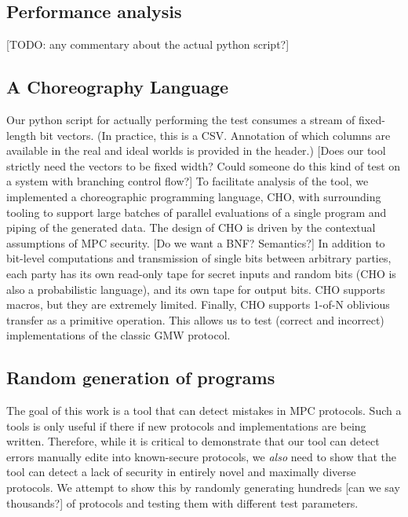 \documentclass[conference]{IEEEtran}
\begin{document}
\subsection{Performance analysis}

[TODO: any commentary about the actual python script?]

\subsection{A Choreography Language}

Our python script for actually performing the test consumes a stream of fixed-length bit vectors.
(In practice, this is a CSV. Annotation of which columns are available in the real and ideal worlds is provided in the header.)
[Does our tool strictly need the vectors to be fixed width? Could someone do this kind of test on a system with branching control flow?]
To facilitate analysis of the tool, we implemented a choreographic programming language, CHO,
with surrounding tooling to support large batches of parallel evaluations of a single program and piping of the generated data.
The design of CHO is driven by the contextual assumptions of MPC security.
[Do we want a BNF? Semantics?]
In addition to bit-level computations and transmission of single bits between arbitrary parties,
each party has its own read-only tape for secret inputs and random bits
(CHO is also a probabilistic language),
and its own tape for output bits.
CHO supports macros, but they are extremely limited.
Finally, CHO supports 1-of-N oblivious transfer as a primitive operation.
This allows us to test (correct and incorrect) implementations of the classic GMW protocol.

\subsection{Random generation of programs}

The goal of this work is a tool that can detect mistakes in MPC protocols.
Such a tools is only useful if there if new protocols and implementations are being written.
Therefore, while it is critical to demonstrate that our tool can detect errors manually edite into known-secure protocols,
we \textit{also} need to show that the tool can detect a lack of security in entirely novel and maximally diverse protocols.
We attempt to show this by randomly generating hundreds [can we say thousands?] of protocols and testing them with different test parameters.
\end{document}
